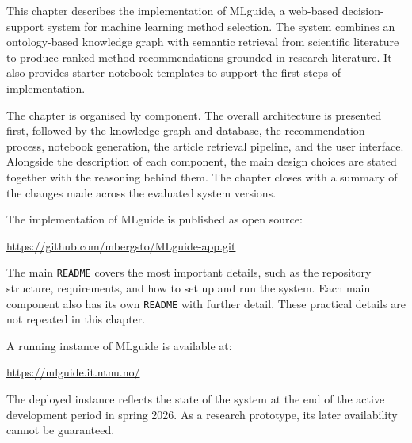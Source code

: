\label{ch:implementation}


This chapter describes the implementation of MLguide, a web-based 
decision-support system for machine learning method selection. The 
system combines an ontology-based knowledge graph with semantic 
retrieval from scientific literature to produce ranked method 
recommendations grounded in research literature. It also provides 
starter notebook templates to support the first steps of 
implementation. 

The chapter is organised by component. The overall architecture is 
presented first, followed by the knowledge graph and database, the 
recommendation process, notebook generation, the article retrieval 
pipeline, and the user interface. Alongside the description of each component, 
the main design choices are stated together with the reasoning behind them.
The chapter closes with a summary of the
changes made across the evaluated system versions.

The implementation of MLguide is published as open source:
\begin{center}
\url{https://github.com/mbergsto/MLguide-app.git}
\end{center}
The main \texttt{README} covers the most important details, such as the
repository structure, requirements, and how to set up and run the
system. Each main component also has its own \texttt{README} with further
detail. These practical details are not repeated in this chapter.

A running instance of MLguide is available at:
\begin{center}
\url{https://mlguide.it.ntnu.no/}
\end{center}
The deployed instance reflects the state of the system at the end
of the active development period in spring 2026. As a research
prototype, its later availability cannot be guaranteed.












